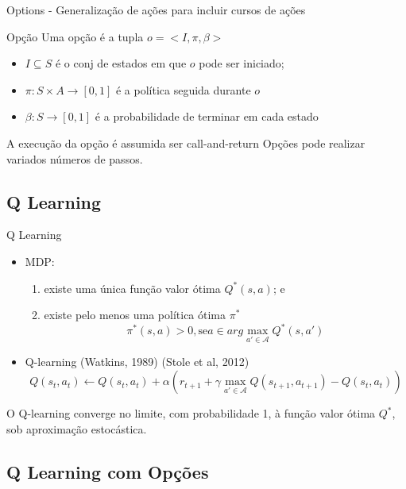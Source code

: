\begin{frame}{Options - Generalização de ações para incluir cursos de ações \nocite{SatinderSingh}}
    \begin{block}{Opção}
        Uma opção é a tupla $o = <I, \pi, \beta>$
        \begin{itemize}
            \item $I \subseteq S$ é o conj de estados em que $o$ pode ser iniciado;
            \item $\pi:S \times A \rightarrow [0,1]$ é a política seguida durante $o$
            \item $\beta:S \rightarrow [0,1]$ é a probabilidade de terminar em cada estado
        \end{itemize}
    \end{block}
    \begin{block}{}
    A execução da opção é assumida ser \alert{call-and-return}
    Opções pode realizar variados números de passos.
    \end{block}
\end{frame}

\subsection{Q Learning}
\begin{frame}{Q Learning}
    \begin{itemize}
        \item MDP:
        \begin{enumerate}
            \item existe uma única função valor ótima $Q^*(s,a)$; e
            \item existe pelo menos uma política ótima $\pi^*$
            $$\pi^*(s,a) > 0, \text{se} a \in arg \max_{a' \in \mathcal{A}}Q^*(s,a')$$
        \end{enumerate}
        \item Q-learning (Watkins, 1989) (Stole et al, 2012) \nocite{stolle2002learning}
        $$Q(s_t,a_t) \leftarrow Q(s_t, a_t) + \alpha(r_{t+1} + \gamma \max_{a' \in \mathcal{A}}Q(s_{t+1},a_{t+1}) - Q(s_t, a_t)) $$
    \end{itemize}
    \vspace{20pt}%
    \centering
    \alert{O Q-learning converge no limite, com probabilidade 1, à função valor ótima $Q^*$, sob aproximação estocástica.}
\end{frame}

\subsection{Q Learning com Opções}


